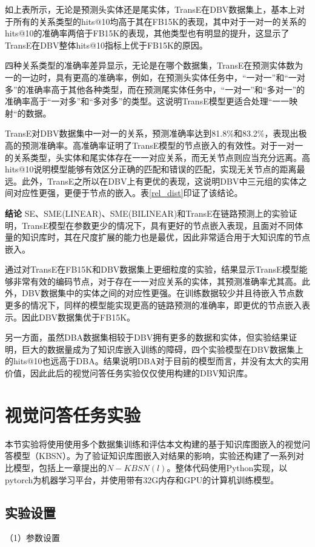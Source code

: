 如上表所示，无论是预测头实体还是尾实体，TransE在DBV数据集上，基本上对于所有的关系类型的hits@10均高于其在FB15K的表现，其中对于一对一的关系的hits@10的准确率两倍于FB15K的表现，其他类型也有明显的提升，这显示了TransE在DBV整体hits@10指标上优于FB15K的原因。

四种关系类型的准确率差异显示，无论是在哪个数据集，TransE在预测实体数为一的一边时，具有更高的准确率，例如，在预测头实体任务中，“一对一”和“一对多”的准确率高于其他各种类型，而在预测尾实体任务中，“一对一”和“多对一”的准确率高于“一对多”和“多对多”的类型。这说明TransE模型更适合处理“一一映射“的数据。

TransE对DBV数据集中一对一的关系，预测准确率达到81.8\%和83.2\%，表现出极高的预测准确率。高准确率证明了TransE模型的节点嵌入的有效性。对于一对一的关系类型，头实体和尾实体存在一一对应关系，而无关节点则应当充分远离。高hits@10说明模型能够有效区分正确的匹配和错误的匹配，实现无关节点的距离最远。此外，TransE之所以在DBV上有更优的表现，这说明DBV中三元组的实体之间对应性更强，更便于节点的嵌入。表\ref{rel_dist}印证了该结论。

\textbf{结论}\qquad
SE、SME(LINEAR)、SME(BILINEAR)和TransE在链路预测上的实验证明，TransE模型在参数更少的情况下，具有更好的节点嵌入表现，且面对不同体量的知识库时，其在尺度扩展的能力也是最优，因此非常适合用于大知识库的节点嵌入。

通过对TransE在FB15K和DBV数据集上更细粒度的实验，结果显示TransE模型能够非常有效的编码节点，对于存在一一对应关系的实体，其预测准确率尤其高。此外，DBV数据集中的实体之间的对应性更强。在训练数据较少并且待嵌入节点数更多的情况下，同样的模型能实现更高的链路预测的准确率，即更优的节点嵌入表示。因此DBV数据集优于FB15K。

另一方面，虽然DBA数据集相较于DBV拥有更多的数据和实体，但实验结果证明，巨大的数据量成为了知识库嵌入训练的障碍，四个实验模型在DBV数据集上的hits@10也远高于DBA。结果说明DBA对于目前的模型而言，并没有太大的实用价值，因此此后的视觉问答任务实验仅仅使用构建的DBV知识库。

\section{视觉问答任务实验}
本节实验将使用使用多个数据集训练和评估本文构建的基于知识库图嵌入的视觉问答模型（KBSN）。为了验证知识库图嵌入对结果的影响，实验还构建了一系列对比模型，包括上一章提出的$N-KBSN(l)$。整体代码使用Python实现，以pytorch为机器学习平台，并使用带有32G内存和GPU的计算机训练模型。

\subsection{实验设置}
（1）参数设置

